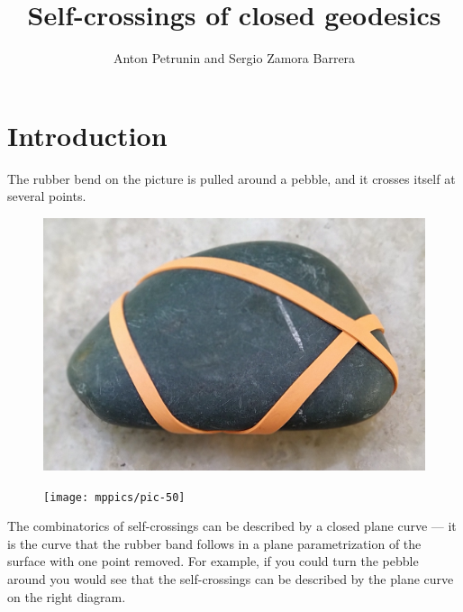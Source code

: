 \documentclass[oneside,a4paper]{amsart}
\begin{document}


\title{Self-crossings of closed geodesics}
\author{Anton Petrunin and Sergio Zamora Barrera}

\maketitle

\section{Introduction}


The rubber bend on the picture is pulled around a pebble,
and it crosses itself at several points.
\begin{figure}[!ht]
\begin{minipage}{.64\textwidth}
\centering
\includegraphics[width=\textwidth]{pics/pebble.jpg}
\end{minipage}\hfill
\begin{minipage}{.34\textwidth}
\centering
\texttt{[image: mppics/pic-50]}
\end{minipage}
\end{figure}
The combinatorics of self-crossings can be described by a closed plane curve --- it is the curve that the rubber band follows in a plane parametrization of the surface with one point removed.
For example, if you could turn the pebble around you would see that the self-crossings can be described by the plane curve on the right diagram.
\end{document}
